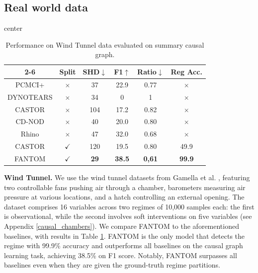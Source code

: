 \subsection{Real world data}
\begin{table}
\caption{Performance on Wind Tunnel data evaluated on summary causal graph.}
\begin{adjustbox}{center}
{\fontsize{8pt}{7pt}\selectfont 
\begin{tabular}{@{}c|c|ccc|c|@{}}
\cmidrule(l){2-6}
          & Split        & SHD$\downarrow$ & F1$\uparrow$   & Ratio$\downarrow$ & Reg Acc. \\ \midrule
PCMCI+    & $\times$     & 37  & 22.9 & 0.77  & $\times$            \\ 
DYNOTEARS & $\times$     & 34  & 0    & 1     & $\times$           \\ 
CASTOR & $\times$     & 104  &   17.2  &  0.82    & $\times$            \\ 
CD-NOD & $\times$     & 40  &  20.0   &  0.80    & $\times$            \\ 
Rhino     & $\times$     & 47  & 32.0 & 0.68  & $\times$            \\ \midrule
CASTOR & $\checkmark$     & 120  & 19.5    &  0.80   & 49.9           \\ 
\rowcolor{gray!20} FANTOM    & $\checkmark$ & \textbf{29}  & \textbf{38.5} & \textbf{0,61}  & \textbf{99.9}         \\ \bottomrule
\end{tabular}}
\end{adjustbox}
\label{table2}
\end{table}
\textbf{Wind Tunnel. }We use the wind tunnel datasets from Gamella et al. \citep{gamella2025causal}, featuring two controllable fans pushing air through a chamber, barometers measuring air pressure at various locations, and a hatch controlling an external opening. The dataset comprises 16 variables across two regimes of 10,000 samples each: the first is observational, while the second involves soft interventions on five variables (see Appendix \ref{causal_chambers}). We compare FANTOM to the aforementioned baselines, with results in Table \ref{table2}. FANTOM is the only model that detects the regime with 99.9\% accuracy and outperforms all baselines on the causal graph learning task, achieving 38.5\% on F1 score. Notably, FANTOM surpasses all baselines even when they are given the ground-truth regime partitions.  

